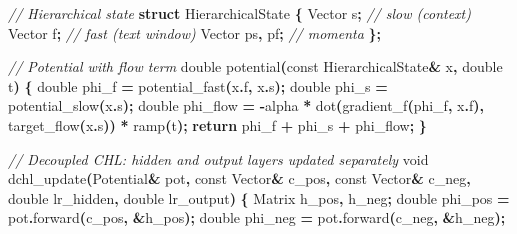 \documentclass[
  11pt,
  a4paper,
]{article}
\newenvironment{Shaded}{\begin{snugshade}}{\end{snugshade}}
\newcommand{\AttributeTok}[1]{\textcolor[rgb]{0.13,0.29,0.53}{#1}}
\newcommand{\CommentTok}[1]{\textcolor[rgb]{0.56,0.35,0.01}{\textit{#1}}}
\newcommand{\ControlFlowTok}[1]{\textcolor[rgb]{0.13,0.29,0.53}{\textbf{#1}}}
\newcommand{\DataTypeTok}[1]{\textcolor[rgb]{0.13,0.29,0.53}{#1}}
\newcommand{\KeywordTok}[1]{\textcolor[rgb]{0.13,0.29,0.53}{\textbf{#1}}}
\newcommand{\NormalTok}[1]{#1}
\newcommand{\OperatorTok}[1]{\textcolor[rgb]{0.81,0.36,0.00}{\textbf{#1}}}
\begin{document}
\begin{Shaded}
\begin{Highlighting}[]
\CommentTok{// Hierarchical state}
\KeywordTok{struct}\NormalTok{ HierarchicalState }\OperatorTok{\{}
\NormalTok{    Vector s}\OperatorTok{;} \CommentTok{// slow (context)}
\NormalTok{    Vector f}\OperatorTok{;} \CommentTok{// fast (text window)}
\NormalTok{    Vector ps}\OperatorTok{,}\NormalTok{ pf}\OperatorTok{;} \CommentTok{// momenta}
\OperatorTok{\};}

\CommentTok{// Potential with flow term}
\DataTypeTok{double}\NormalTok{ potential}\OperatorTok{(}\AttributeTok{const}\NormalTok{ HierarchicalState}\OperatorTok{\&}\NormalTok{ x}\OperatorTok{,} \DataTypeTok{double}\NormalTok{ t}\OperatorTok{)} \OperatorTok{\{}
    \DataTypeTok{double}\NormalTok{ phi\_f }\OperatorTok{=}\NormalTok{ potential\_fast}\OperatorTok{(}\NormalTok{x}\OperatorTok{.}\NormalTok{f}\OperatorTok{,}\NormalTok{ x}\OperatorTok{.}\NormalTok{s}\OperatorTok{);}
    \DataTypeTok{double}\NormalTok{ phi\_s }\OperatorTok{=}\NormalTok{ potential\_slow}\OperatorTok{(}\NormalTok{x}\OperatorTok{.}\NormalTok{s}\OperatorTok{);}
    \DataTypeTok{double}\NormalTok{ phi\_flow }\OperatorTok{=} \OperatorTok{{-}}\NormalTok{alpha }\OperatorTok{*}\NormalTok{ dot}\OperatorTok{(}\NormalTok{gradient\_f}\OperatorTok{(}\NormalTok{phi\_f}\OperatorTok{,}\NormalTok{ x}\OperatorTok{.}\NormalTok{f}\OperatorTok{),}\NormalTok{ target\_flow}\OperatorTok{(}\NormalTok{x}\OperatorTok{.}\NormalTok{s}\OperatorTok{))} \OperatorTok{*}\NormalTok{ ramp}\OperatorTok{(}\NormalTok{t}\OperatorTok{);}
    \ControlFlowTok{return}\NormalTok{ phi\_f }\OperatorTok{+}\NormalTok{ phi\_s }\OperatorTok{+}\NormalTok{ phi\_flow}\OperatorTok{;}
\OperatorTok{\}}

\CommentTok{// Decoupled CHL: hidden and output layers updated separately}
\DataTypeTok{void}\NormalTok{ dchl\_update}\OperatorTok{(}\NormalTok{Potential}\OperatorTok{\&}\NormalTok{ pot}\OperatorTok{,} \AttributeTok{const}\NormalTok{ Vector}\OperatorTok{\&}\NormalTok{ c\_pos}\OperatorTok{,} \AttributeTok{const}\NormalTok{ Vector}\OperatorTok{\&}\NormalTok{ c\_neg}\OperatorTok{,}
                 \DataTypeTok{double}\NormalTok{ lr\_hidden}\OperatorTok{,} \DataTypeTok{double}\NormalTok{ lr\_output}\OperatorTok{)} \OperatorTok{\{}
\NormalTok{    Matrix h\_pos}\OperatorTok{,}\NormalTok{ h\_neg}\OperatorTok{;}
    \DataTypeTok{double}\NormalTok{ phi\_pos }\OperatorTok{=}\NormalTok{ pot}\OperatorTok{.}\NormalTok{forward}\OperatorTok{(}\NormalTok{c\_pos}\OperatorTok{,} \OperatorTok{\&}\NormalTok{h\_pos}\OperatorTok{);}
    \DataTypeTok{double}\NormalTok{ phi\_neg }\OperatorTok{=}\NormalTok{ pot}\OperatorTok{.}\NormalTok{forward}\OperatorTok{(}\NormalTok{c\_neg}\OperatorTok{,} \OperatorTok{\&}\NormalTok{h\_neg}\OperatorTok{);}


\end{Highlighting}
\end{Shaded}
\end{document}
